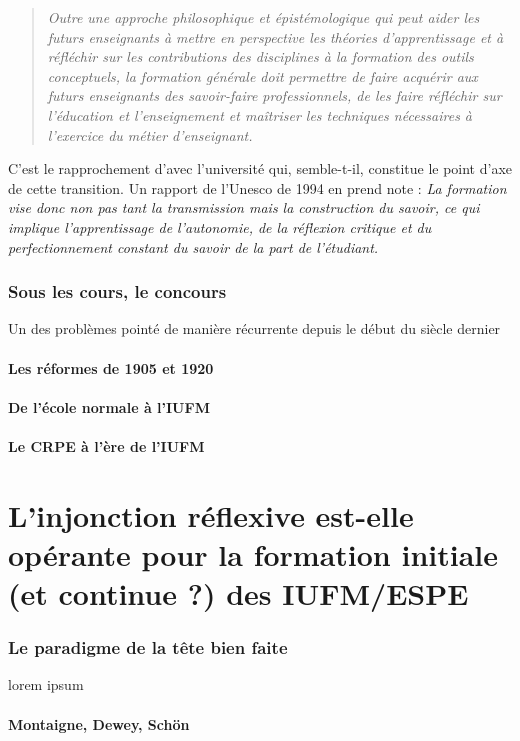 \documentclass[a4paper,11pt]{article}
\begin{document}
\begin{quote}
\emph{Outre une approche philosophique et épistémologique qui peut aider les futurs enseignants à mettre en perspective les théories d'apprentissage et à réfléchir sur les contributions des disciplines à la formation des outils conceptuels, la formation générale doit permettre de faire acquérir aux futurs enseignants des savoir-faire professionnels, de les faire réfléchir sur l'éducation et l'enseignement et maîtriser les techniques nécessaires à l'exercice du métier d'enseignant.}
\end{quote}
C'est le rapprochement d'avec l'université qui, semble-t-il, constitue le point d'axe de cette transition. Un rapport de l'Unesco de 1994 en prend note \cite{cam94} : \emph{La formation vise donc non pas tant la transmission mais la construction du savoir, ce qui implique l'apprentissage de l'autonomie, de la réflexion critique et du perfectionnement constant du savoir de la part de l'étudiant.}
\section{Sous les cours, le concours}
Un des problèmes pointé de manière récurrente depuis le début du siècle dernier
			\subsection{Les réformes de 1905 et 1920}
			\subsection{De l'école normale à l'IUFM}
			\subsection{Le CRPE à l'ère de l'IUFM}


\part{L'injonction réflexive est-elle opérante pour la formation initiale (et continue ?) des IUFM/ESPE}

\section{Le paradigme de la tête bien faite}
lorem ipsum
			\subsection{Montaigne, Dewey, Schön}
\end{document}
